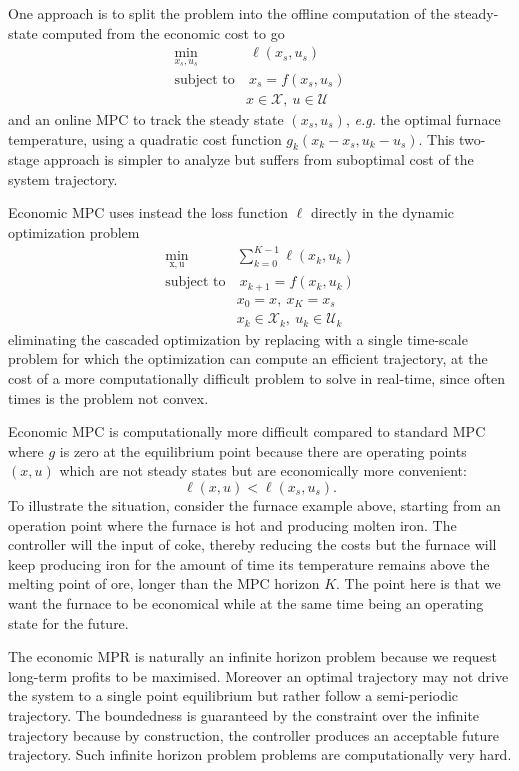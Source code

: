 \documentclass[11pt]{report}
\newcommand{\bs}[1]{\boldsymbol{#1}}
\newcommand{\bsu}{\bs{\mathrm{u}}}
\newcommand{\bsx}{\bs{\mathrm{x}}}
\begin{document}
One approach is to split the problem into the offline computation of the steady-state computed from the economic cost to go
\begin{align*}
  \min_{x_s,u_s} &\ \ell(x_s,u_s) \\
  \text{subject to} &\ x_s = f(x_s,u_s) \\
                 & x\in \mathcal{X},\ u\in \mathcal{U}
\end{align*}
and an online MPC to track the steady state $(x_s,u_s)$, \textit{e.g.} the optimal furnace temperature, using a quadratic cost function $g_k(x_k-x_s,u_k-u_s)$. This two-stage approach is simpler to analyze but suffers from suboptimal cost of the system trajectory.

Economic MPC uses instead the loss function $\ell$ directly in the dynamic optimization problem
\begin{align*}
  \min_{\bsx,\bsu} & \sum_{k=0}^{K-1} \ell(x_k,u_k) \\
  \text{subject to} &\ x_{k+1} = f(x_k,u_k) \\
                   & x_0 = x,\ x_K=x_s \\
                   & x_k\in \mathcal{X}_k,\ u_k\in \mathcal{U}_k
\end{align*}
eliminating the cascaded optimization by replacing with a single time-scale problem for which the optimization can compute an efficient trajectory, at the cost of a more computationally difficult problem to solve in real-time, since often times is the problem not convex.

Economic MPC is computationally more difficult compared to standard MPC where $g$ is zero at the equilibrium point because there are operating points $(x,u)$ which are not steady states but are economically more convenient:
\begin{equation*}
  \ell(x,u) < \ell(x_s,u_s).
\end{equation*}
To illustrate the situation, consider the furnace example above, starting from an operation point where the furnace is hot and producing molten iron. The controller will the input of coke, thereby reducing the costs but the furnace will keep producing iron for the amount of time its temperature remains above the melting point of ore, longer than the MPC horizon $K$. The point here is that we want the furnace to be economical while at the same time being an operating state for the future.

The economic MPR is naturally an infinite horizon problem because we request long-term profits to be maximised. Moreover an optimal trajectory may not drive the system to a single point equilibrium but rather follow a semi-periodic trajectory. The boundedness is guaranteed by the constraint over the infinite trajectory because by construction, the controller produces an acceptable future trajectory. Such infinite horizon problem problems are computationally very hard.
\end{document}
